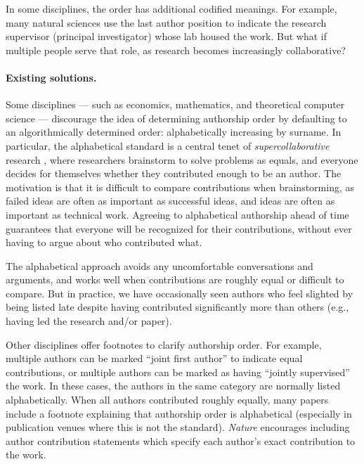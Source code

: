 \documentclass[natbib,authoryear]{sigtbd17-style}
\begin{document}
In some disciplines, the order has additional codified meanings.
For example, many natural sciences use the last author position to indicate the
research supervisor (principal investigator) whose lab housed the work.
But what if multiple people serve that role, as research becomes
increasingly collaborative?

\paragraph{Existing solutions.}

Some disciplines --- such as economics, mathematics, and
theoretical computer science --- discourage the idea of determining authorship
order by defaulting to an algorithmically determined order:
alphabetically increasing by surname.
In particular, the alphabetical standard is a central tenet of
\emph{supercollaborative} research \citep{supercollaboration},
where researchers brainstorm to solve problems as equals,
and everyone decides for themselves whether they contributed
enough to be an author.
The motivation is that it is difficult to compare contributions when
brainstorming, as failed ideas are often as important as successful ideas,
and ideas are often as important as technical work.
Agreeing to alphabetical authorship ahead of time guarantees that everyone
will be recognized for their contributions, without ever having to argue
about who contributed what.

The alphabetical approach avoids any uncomfortable conversations and arguments,
and works well when contributions are roughly equal or difficult to compare.
But in practice, we have occasionally seen authors who feel slighted
by being listed late despite having contributed significantly more than others
(e.g., having led the research and/or paper).

Other disciplines offer footnotes to clarify authorship order. For example,
multiple authors can be marked ``joint first author'' to indicate
equal contributions, or multiple authors can be marked as having
``jointly supervised'' the work.
In these cases, the authors in the same category
are normally listed alphabetically.
When all authors contributed roughly equally,
many papers include a footnote explaining that authorship order is alphabetical
(especially in publication venues where this is not the standard).
\emph{Nature} encourages including author contribution statements which
specify each author's exact contribution to the work.
\end{document}
